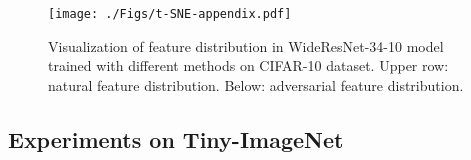 \documentclass[10pt,twocolumn,letterpaper]{article}
\begin{document}
\begin{figure*}[!h]
\centering
\texttt{[image: ./Figs/t-SNE-appendix.pdf]}
    \caption{Visualization of feature distribution in WideResNet-34-10 model trained with different methods on CIFAR-10 dataset. Upper row: natural feature distribution. Below: adversarial feature distribution.}
\label{fig:distribution}
\end{figure*}

  


\subsection{Experiments on Tiny-ImageNet}
\end{document}
